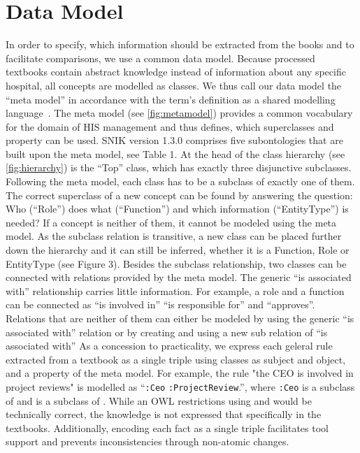 \documentclass[conference]{IEEEtran}
\newcommand{\citep}{\cite}%
\newcommand{\snikversion}{1.3.0}
\begin{document}
\section{Data Model}
In order to specify, which information should be extracted from the books and to facilitate comparisons, we use a common data model.
Because processed textbooks contain abstract knowledge instead of information about any specific hospital, all concepts are modelled as classes.
We thus call our data model the \enquote{meta model} in accordance with the term's definition as a shared modelling language~\citep[p.~8]{ob}.
The meta model (see \cref{fig:metamodel}) provides a common vocabulary for the domain of HIS management and thus defines, which superclasses and property can be used.
SNIK version \snikversion{} comprises five subontologies that are built upon the meta model, see Table 1.
At the head of the class hierarchy (see \cref{fig:hierarchy}) is the \enquote{Top} class, which has exactly three disjunctive subclasses.
%
Following the meta model, each class has to be a subclass of exactly one of them.
The correct superclass of a new concept can be found by answering the question: Who (\enquote{Role}) does what (\enquote{Function}) and which information (\enquote{EntityType}) is needed? If a concept is neither of them, it cannot be modeled using the meta model.
As the subclass relation is transitive, a new class can be placed further down the hierarchy and it can still be inferred, whether it is a Function, Role or EntityType (see Figure 3).
Besides the subclass relationship, two classes can be connected with relations provided by the meta model.
The generic \enquote{is associated with} relationship carries little information.
For example, a role and a function can be connected as \enquote{is involved in} \enquote{is responsible for} and \enquote{approves}.
Relations that are neither of them can either be modeled by using the generic \enquote{is associated with} relation or by creating and using a new sub relation of \enquote{is associated with}
%
As a concession to practicality, we express each geleral rule extracted from a textbook as a single triple using classes as subject and object, and a property of the meta model.
For example, the rule "the CEO is involved in project reviews" is modelled as \enquote{\texttt{:Ceo}  \texttt{:ProjectReview}.}, where \texttt{:Ceo} is a subclass of  and  is a subclass of .
While an OWL restrictions using  and  would be technically correct, the knowledge is not expressed that specifically in the textbooks.
Additionally, encoding each fact as a single triple facilitates tool support and prevents inconsistencies through non-atomic changes.
\end{document}
